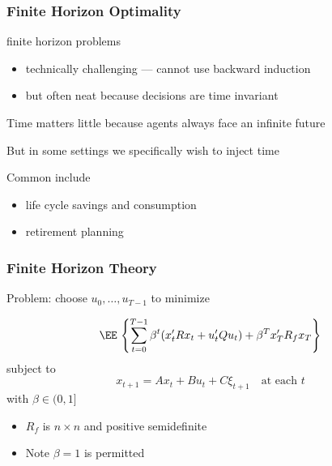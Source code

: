 \begin{frame}
    \frametitle{Finite Horizon Optimality}

    finite horizon problems
    \begin{itemize}
        \item technically challenging --- cannot use backward induction
        \item but often neat because decisions are time invariant
    \end{itemize}
    
        \vspace{0.5em}
    Time matters little because agents always face an infinite future

        \vspace{0.5em}
        \vspace{0.5em}
    But in some settings we specifically wish to inject time

    Common  include

    \begin{itemize}
        \item life cycle savings and consumption
        \item retirement planning
    \end{itemize}


\end{frame}


\begin{frame}
    \frametitle{Finite Horizon Theory}
    
    Problem: choose $u_0, \ldots, u_{T-1}$ to minimize 

    \begin{equation*}
        \label{eq:lq_object}
        \EE \,
        \left\{
            \sum_{t=0}^{T-1} \beta^t (x_t' R x_t + u_t' Q u_t) + \beta^T x_T' R_f x_T
        \right\}
    \end{equation*}
    subject to 
    \begin{equation*}
        x_{t+1} = A x_t + B u_t + C \xi_{t+1}
        \quad \text{at each } t
    \end{equation*}
    with $\beta \in (0, 1]$ 
    
    \begin{itemize}
        \item $R_f$ is $n \times n$ and positive semidefinite
        \vspace{0.5em}
        \item Note $\beta = 1$ is permitted
    \end{itemize}

\end{frame}


